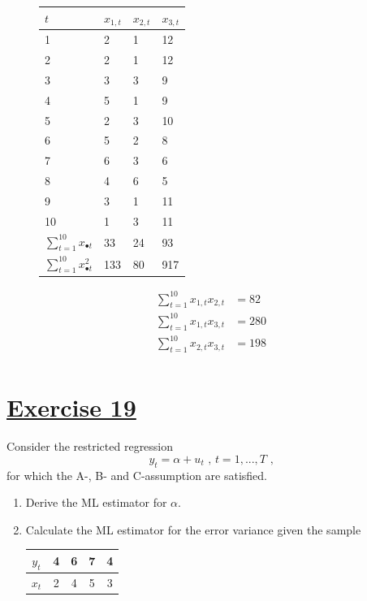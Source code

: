 \documentclass[captions=tableheading, 12pt, headings=small, parskip=half]{scrartcl}
\begin{document}
\begin{enumerate}[label = \alph*)]
\begin{enumerate}[label = (\roman*)]
\begin{figure}[h!]
\begin{minipage}{0.49\columnwidth}
\begin{table}[H]
	\centering
	\begin{tabular}{llll}
	\toprule
	\toprule
	$t$&$x_{1,t}$&$x_{2,t}$&$x_{3,t}$\\
	\midrule
	1 & 2 & 1 & 12 \\ 
	2 & 2 & 1 & 12 \\ 
	3 & 3 & 3 & 9 \\ 
	4 & 5 & 1 & 9 \\ 
	5 & 2 & 3 & 10 \\ 
	6 & 5 & 2 & 8 \\ 
	7 & 6 & 3 & 6 \\ 
	8 & 4 & 6 & 5 \\ 
	9 & 3 & 1 & 11 \\ 
	10 & 1 & 3 & 11 \\
	\midrule
	$\sum_{t = 1}^{10}{x_{\bullet t}}$ &33&24&93\\
	$\sum_{t = 1}^{10}{x_{\bullet t}^2}$ &133&80&917\\
	\bottomrule
	\bottomrule  
\end{tabular}
\end{table}
\end{minipage}
\hfill
\begin{minipage}{0.49\columnwidth}
	\begin{align*}
	\sum_{t = 1}^{10}{x_{1,t}x_{2,t}} &= 82\\
	\sum_{t = 1}^{10}{x_{1,t}x_{3,t}} &= 280\\
	\sum_{t = 1}^{10}{x_{2,t}x_{3,t}} &= 198\\
	\end{align*}
\end{minipage}
\end{figure}
\end{enumerate}
\end{enumerate}
\newpage
\section*{\underline{Exercise 19}}
Consider the restricted regression
\[
y_t = \alpha + u_t\text{ , }t = 1,...,T\text{ ,}
\]for which the A-, B- and C-assumption are satisfied.
\begin{enumerate}[label = \alph*)]
	\item Derive the ML estimator for $\alpha$.
	\item Calculate the ML estimator for the error variance given the sample
	\begin{table}[H]
		\centering
		\begin{tabular}{c|cccc}
			\toprule
			$y_t$ & 4&6&7&4\\
			\midrule
			$x_t$ & 2&4&5&3\\
			\bottomrule
		\end{tabular}
	\end{table}
\end{enumerate}
\end{document}
